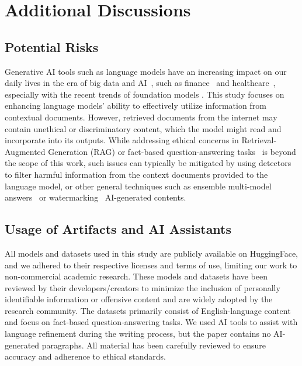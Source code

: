 \section{Additional Discussions}

\subsection{Potential Risks}

Generative AI tools such as language models have an increasing impact on our daily lives in the era of big data and AI~\cite{yan2024pacer,xuslog,ban2021ee,lin2024bemap,lin2024backtime,guo2023taming}, such as finance~\cite{chan2024group,liu2024aim} and healthcare~\cite{ye2023web,liu2024class}, especially with the recent trends of foundation models \cite{DBLP:conf/kdd/ZhengJLTH24, DBLP:journals/corr/abs-2410-12126, DBLP:journals/corr/abs-2412-21151, DBLP:journals/corr/abs-2412-08174}.
This study focuses on enhancing language models' ability to effectively utilize information from contextual documents. However, retrieved documents from the internet may contain unethical or discriminatory content, which the model might read and incorporate into its outputs. While addressing ethical concerns in Retrieval-Augmented Generation (RAG) or fact-based question-answering tasks~\cite{cornnet,binet,kompare} is beyond the scope of this work, such issues can typically be mitigated by using detectors to filter harmful information from the context documents provided to the language model, or other general techniques such as ensemble multi-model answers~\cite{liu2021imbens,liu2020self,liu2020mesa} or watermarking~\cite{chen2024wapiti} AI-generated contents.

\subsection{Usage of Artifacts and AI Assistants}

All models and datasets used in this study are publicly available on HuggingFace, and we adhered to their respective licenses and terms of use, limiting our work to non-commercial academic research. These models and datasets have been reviewed by their developers/creators to minimize the inclusion of personally identifiable information or offensive content and are widely adopted by the research community. The datasets primarily consist of English-language content and focus on fact-based question-answering tasks. We used AI tools to assist with language refinement during the writing process, but the paper contains no AI-generated paragraphs. All material has been carefully reviewed to ensure accuracy and adherence to ethical standards.